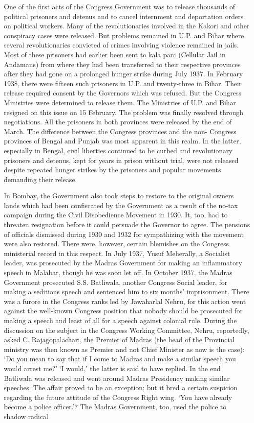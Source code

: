 One of the first acts of the Congress Government was to release thousands of political prisoners and detenus and to cancel internment and deportation orders on political workers. Many of the revolutionaries involved in the Kakori and other conspiracy cases were released. But problems remained in U.P. and Bihar where several revolutionaries convicted of crimes involving violence remained in jails. Most of these prisoners had earlier been sent to kala pani (Cellular Jail in Andamans) from where they had been transferred to their respective provinces after they had gone on a prolonged hunger strike during July 1937. In February 1938, there were fifteen such prisoners in U.P. and twenty-three in Bihar. Their release required consent by the Governors which was refused. But the Congress Ministries were determined to release them. The Ministries of U.P. and Bihar resigned on this issue on 15 February. The problem was finally resolved through negotiations. All the prisoners in both provinces were released by the end of March. The difference between the Congress provinces and the non- Congress provinces of Bengal and Punjab was most apparent in this realm. In the latter, especially in Bengal, civil liberties continued to be curbed and revolutionary prisoners and detenus, kept for years in prison without trial, were not released despite repeated hunger strikes by the prisoners and popular movements demanding their release. 

In Bombay, the Government also took steps to restore to the original owners lands which had been confiscated by the Government as a result of the no-tax campaign during the Civil Disobedience Movement in 1930. It, too, had to threaten resignation before it could persuade the Governor to agree. The pensions of officials dismissed during 1930 and 1932 for sympathizing with the movement were also restored. There were, however, certain blemishes on the Congress ministerial record in this respect. In July 1937, Yusuf Meherally, a Socialist leader, was prosecuted by the Madras Government for making an inflammatory speech in Malabar, though he was soon let off. In October 1937, the Madras Government prosecuted S.S. Batliwala, another Congress Social leader, for making a seditious speech and sentenced him to six months' imprisonment. There was a furore in the Congress ranks led by Jawaharlal Nehru, for this action went against the well-known Congress position that nobody should be prosecuted for making a speech and least of all for a speech against colonial rule. During the discussion on the subject in the Congress Working Committee, Nehru, reportedly, asked C. Rajagopalachari, the Premier of Madras (the head of the Provincial ministry was then known as Premier and not Chief Minister as now is the case): `Do you mean to say that if I come to Madras and make a similar speech you would arrest me?' `I would,' the latter is said to have replied. In the end Batliwala was released and went around Madras Presidency making similar speeches. The affair proved to be an exception; but it bred a certain suspicion regarding the future attitude of the Congress Right wing. `You have already become a police officer.'7 The Madras Government, too, used the police to shadow radical 

